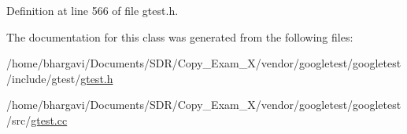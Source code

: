 Definition at line 566 of file gtest.\+h.



The documentation for this class was generated from the following files\+:\begin{DoxyCompactItemize}
\item 
/home/bhargavi/\+Documents/\+S\+D\+R/\+Copy\+\_\+\+Exam\+\_\+X/vendor/googletest/googletest/include/gtest/\hyperlink{gtest_8h}{gtest.\+h}\item 
/home/bhargavi/\+Documents/\+S\+D\+R/\+Copy\+\_\+\+Exam\+\_\+X/vendor/googletest/googletest/src/\hyperlink{gtest_8cc}{gtest.\+cc}\end{DoxyCompactItemize}
